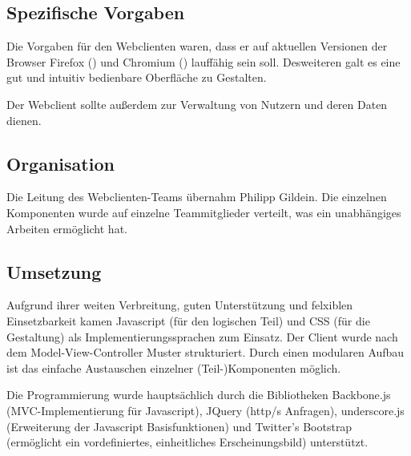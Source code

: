\subsection*{Spezifische Vorgaben}

Die Vorgaben für den Webclienten waren, dass er auf aktuellen Versionen der Browser Firefox () und Chromium () lauffähig sein soll. Desweiteren galt es eine gut und intuitiv bedienbare Oberfläche zu Gestalten.

Der Webclient sollte außerdem zur Verwaltung von Nutzern und deren Daten dienen.

\subsection*{Organisation}

Die Leitung des Webclienten-Teams übernahm Philipp Gildein. Die einzelnen Komponenten wurde auf einzelne Teammitglieder verteilt, was ein unabhängiges Arbeiten ermöglicht hat. 

\subsection*{Umsetzung}

Aufgrund ihrer weiten Verbreitung, guten Unterstützung und felxiblen Einsetzbarkeit kamen Javascript (für den logischen Teil) und CSS (für die Gestaltung) als Implementierungssprachen zum Einsatz. Der Client wurde nach dem Model-View-Controller Muster strukturiert. Durch einen modularen Aufbau ist das einfache Austauschen einzelner (Teil-)Komponenten möglich.

Die Programmierung wurde hauptsächlich durch die Bibliotheken Backbone.js (MVC-Implementierung für Javascript), JQuery (http/s Anfragen), underscore.js (Erweiterung der Javascript Basisfunktionen) und Twitter's Bootstrap (ermöglicht ein vordefiniertes, einheitliches Erscheinungsbild) unterstützt.